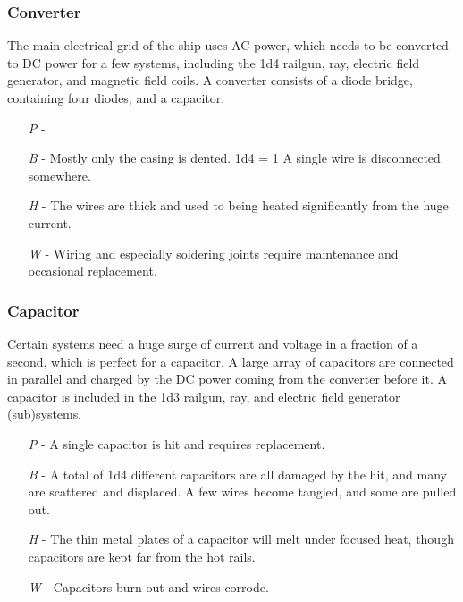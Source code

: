 \documentclass[a4paper]{article}
\begin{document}
\vspace{-0.5cm} \hspace{-18pt} \subsubsection{Converter} \label{grid_converter} \vspace{-0.2cm}
The main electrical grid of the ship uses AC power, which needs to be converted to DC power for a few systems, including the 1d4 railgun, ray, electric field generator, and magnetic field coils. A converter consists of a diode bridge, containing four diodes, and a capacitor. 

\begin{enumerate}
\item [\textit{P}] - 
\item [\textit{B}] - Mostly only the casing is dented. \newline \hspace*{3pt} 1d4 = 1 A single wire is disconnected somewhere.
\item [\textit{H}] - The wires are thick and used to being heated significantly from the huge current.
\item [\textit{W}] - Wiring and especially soldering joints require maintenance and occasional replacement.
\end{enumerate}

\vspace{-0.5cm} \hspace{-18pt} \subsubsection{Capacitor} \label{grid_capacitor} \vspace{-0.2cm}
Certain systems need a huge surge of current and voltage in a fraction of a second, which is perfect for a capacitor. A large array of capacitors are connected in parallel and charged by the DC power coming from the converter before it. A capacitor is included in the 1d3 railgun, ray, and electric field generator (sub)systems.
\begin{enumerate}
\item [\textit{P}] - A single capacitor is hit and requires replacement.
\item [\textit{B}] - A total of 1d4 different capacitors are all damaged by the hit, and many are scattered and displaced. A few wires become tangled, and some are pulled out.
\item [\textit{H}] - The thin metal plates of a capacitor will melt under focused heat, though capacitors are kept far from the hot rails.
\item [\textit{W}] - Capacitors burn out and wires corrode.
\end{enumerate}
\end{document}
